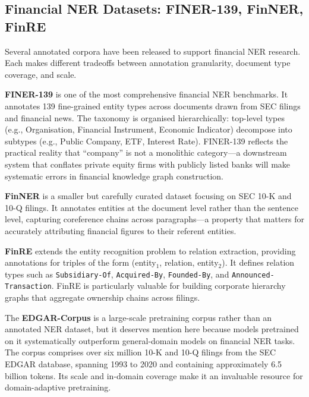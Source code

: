 \subsection{Financial NER Datasets: FINER-139, FinNER, FinRE}
\label{sec:ch14-ner-datasets}

Several annotated corpora have been released to support financial NER research. Each
makes different tradeoffs between annotation granularity, document type coverage, and
scale.

\textbf{FINER-139} \citep{loukas2022finer} is one of the most comprehensive financial NER
benchmarks. It annotates 139 fine-grained entity types across documents drawn from SEC
filings and financial news. The taxonomy is organised hierarchically: top-level types
(e.g., Organisation, Financial Instrument, Economic Indicator) decompose into subtypes
(e.g., Public Company, ETF, Interest Rate). FINER-139 reflects the practical reality
that ``company'' is not a monolithic category---a downstream system that conflates private
equity firms with publicly listed banks will make systematic errors in financial knowledge
graph construction.

\textbf{FinNER} is a smaller but carefully curated dataset focusing on SEC 10-K and 10-Q
filings. It annotates entities at the document level rather than the sentence level,
capturing coreference chains across paragraphs---a property that matters for accurately
attributing financial figures to their referent entities.

\textbf{FinRE} extends the entity recognition problem to relation extraction,
providing annotations for triples of the form (entity$_1$, relation, entity$_2$). It
defines relation types such as \texttt{Subsidiary-Of}, \texttt{Acquired-By},
\texttt{Founded-By}, and \texttt{Announced-Transaction}. FinRE is particularly valuable
for building corporate hierarchy graphs that aggregate ownership chains across filings.

The \textbf{EDGAR-Corpus} \citep{loukas2021edgar} is a large-scale pretraining corpus
rather than an annotated NER dataset, but it deserves mention here because models
pretrained on it systematically outperform general-domain models on financial NER tasks.
The corpus comprises over six million 10-K and 10-Q filings from the SEC EDGAR database,
spanning 1993 to 2020 and containing approximately 6.5 billion tokens. Its scale and
in-domain coverage make it an invaluable resource for domain-adaptive pretraining.

